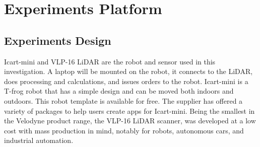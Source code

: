 \section{Experiments Platform}

\subsection{Experiments Design}
\label{Experiments_design_subsection}

Icart-mini \cite{icart_mini} and VLP-16 LiDAR \cite{vlp16} are the robot and sensor used in this investigation. 
A laptop will be mounted on the robot, it connects to the LiDAR, does 
processing and calculations, and issues orders to the robot. Icart-mini is a 
T-frog robot that has a simple design and can be moved both indoors and outdoors. 
This robot template is available for free. The supplier has offered a variety of 
packages to help users create apps for Icart-mini. Being the smallest in the Velodyne 
product range, the VLP-16 LiDAR scanner, was developed at a low cost with mass 
production in mind, notably for robots, autonomous cars, and industrial automation.

